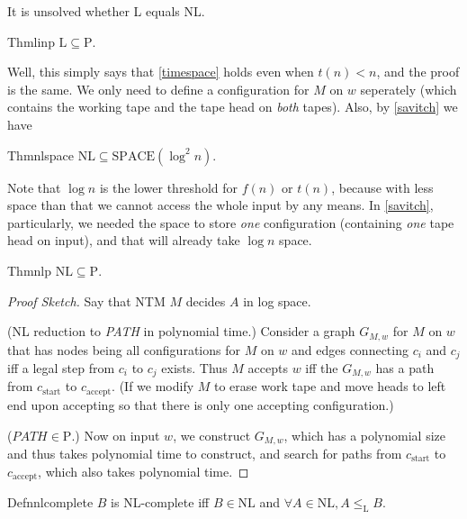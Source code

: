 It is unsolved whether L equals NL.

\begin{reference}{Thm}{linp}
  $\mathrm{L}\subseteq \mathrm{P}$.
\end{reference}

Well, this simply says that \ref{timespace} holds even when $t(n)<n$, and the proof is the same. We only need to define a configuration for $M$ on $w$ seperately (which contains the working tape and the tape head on \textit{both} tapes). Also, by \ref{savitch} we have

\begin{reference}{Thm}{nlspace}
  $\mathrm{NL}\subseteq \mathrm{SPACE}(\log^2n)$.
\end{reference}

Note that $\log n$ is the lower threshold for $f(n)$ or $t(n)$, because with less space than that we cannot access the whole input by any means. In \ref{savitch}, particularly, we needed the space to store \textit{one} configuration (containing \textit{one} tape head on input), and that will already take $\log n$ space.

\begin{reference}{Thm}{nlp}
  $\mathrm{NL}\subseteq \mathrm{P}$.
\end{reference}

\begin{proof}[Proof Sketch]
  Say that NTM $M$ decides $A$ in log space.

  (NL reduction to \textit{PATH} in polynomial time.) Consider a graph $G_{M,w}$ for $M$ on $w$ that has nodes being all configurations for $M$ on $w$ and edges connecting $c_i$ and $c_j$ iff a legal step from $c_i$ to $c_j$ exists. Thus $M$ accepts $w$ iff the $G_{M,w}$ has a path from $c_{\mathrm{start}}$ to $c_{\mathrm{accept}}$. (If we modify $M$ to erase work tape and move heads to left end upon accepting so that there is only one accepting configuration.)

  ($\textit{PATH}\in \mathrm{P}$.) Now on input $w$, we construct $G_{M,w}$, which has a polynomial size and thus takes polynomial time to construct, and search for paths from $c_{\mathrm{start}}$ to $c_{\mathrm{accept}}$, which also takes polynomial time.
\end{proof}

\begin{reference}{Defn}{nlcomplete}
  $B$ is NL-complete iff $B\in \mathrm{NL}$ and $\forall A\in \mathrm{NL}, A\leq_{\mathrm{L}}B$.
\end{reference}

